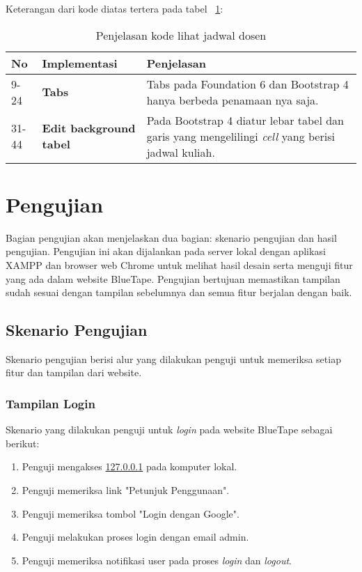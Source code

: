 Keterangan dari kode diatas tertera pada tabel ~\ref{tabel:lihatJadwalDosen}:
\begin{table}[H]
	\centering
	\caption{Penjelasan kode lihat jadwal dosen}
	\begin{tabularx}{\textwidth}{llX}
		\toprule
		No & Implementasi     & Penjelasan \\
		\midrule
		9-24 & \textbf{Tabs}  & Tabs pada Foundation 6 dan Bootstrap 4 hanya berbeda penamaan nya saja.\\
		31-44 & \textbf{Edit background tabel}  & Pada Bootstrap 4 diatur lebar tabel dan garis yang mengelilingi \textit{cell} yang berisi jadwal kuliah.\\
		\bottomrule
	\end{tabularx}%
	\label{tabel:lihatJadwalDosen}
\end{table}

\section{Pengujian}
Bagian pengujian akan menjelaskan dua bagian: skenario pengujian dan hasil pengujian. Pengujian ini akan dijalankan pada server lokal dengan aplikasi XAMPP dan browser web Chrome untuk melihat hasil desain serta menguji fitur yang ada dalam website BlueTape. Pengujian bertujuan memastikan tampilan sudah sesuai dengan tampilan sebelumnya dan semua fitur berjalan dengan baik.
\subsection{Skenario Pengujian}
Skenario pengujian berisi alur yang dilakukan penguji untuk memeriksa setiap fitur dan tampilan dari website. 
\subsubsection{Tampilan Login}
Skenario yang dilakukan penguji untuk \textit{login} pada website BlueTape sebagai berikut:
\begin{enumerate}
	\item Penguji mengakses \url{127.0.0.1} pada komputer lokal.
	\item Penguji memeriksa link "Petunjuk Penggunaan".
	\item Penguji memeriksa tombol "Login dengan Google".
	\item Penguji melakukan proses login dengan email admin.
	\item Penguji memeriksa notifikasi user pada proses \textit{login} dan \textit{logout}.	
\end{enumerate}

